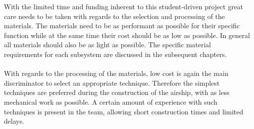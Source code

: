 With the limited time and funding inherent to this student-driven project great care needs to be taken with regards to the selection and processing of the materials. The materials need to be as performant as possible for their specific function while at the same time their cost should be as low as possible. In general all materials should also be as light as possible. The specific material requirements for each subsystem are discussed in the subsequent chapters.
\\
\\
With regards to the processing of the materials, low cost is again the main discriminator to select an appropriate technique. Therefore the simplest techniques are preferred during the construction of the airship, with as less mechanical work as possible. A certain amount of experience with such techniques is present in the team, allowing short construction times and limited delays.